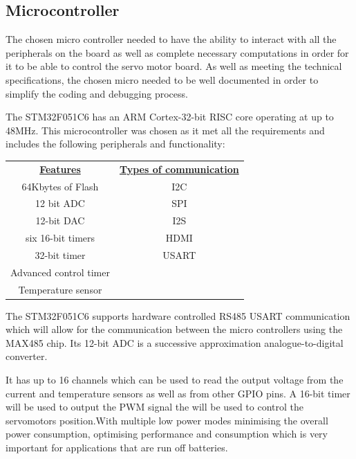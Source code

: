 \subsection{Microcontroller}
The chosen micro controller needed to have the ability to interact with all the peripherals on the board as well as complete necessary computations in order for it to be able to control the servo motor board. As well as meeting the technical specifications, the chosen micro needed to be well documented in order to simplify the coding and debugging process.

The STM32F051C6 has an ARM Cortex-32-bit RISC core operating at up to 48MHz. This microcontroller was chosen as it met all the requirements and includes the following peripherals and functionality:
\vspace{5mm}
\begin{table}[H]
\centering
    \begin{tabular}{|c|c|}
    \hline
      \textbf{\underline{Features}} & \textbf{\underline{Types of communication}}\\
      64Kbytes of Flash & I2C \\
      12 bit ADC & SPI\\
      12-bit DAC & I2S\\
      six 16-bit timers & HDMI\\
      32-bit timer & USART\\
      Advanced control timer & \\
      Temperature sensor & \\
      \hline
    \end{tabular}
\end{table}
\vspace{-5mm}
The STM32F051C6 supports hardware controlled RS485 USART communication which will allow for the communication between the micro controllers using the MAX485 chip.
Its 12-bit ADC is a successive approximation analogue-to-digital converter. 

\newpage 
\vspace{5mm}
It has up to 16 channels which can be used to read the output voltage from the current and temperature sensors as well as from other GPIO pins. A 16-bit timer will be used to output the PWM signal the will be used to control the servomotors position.With multiple low power modes minimising the overall power consumption, optimising performance and consumption which is very important for applications that are run off batteries. 

